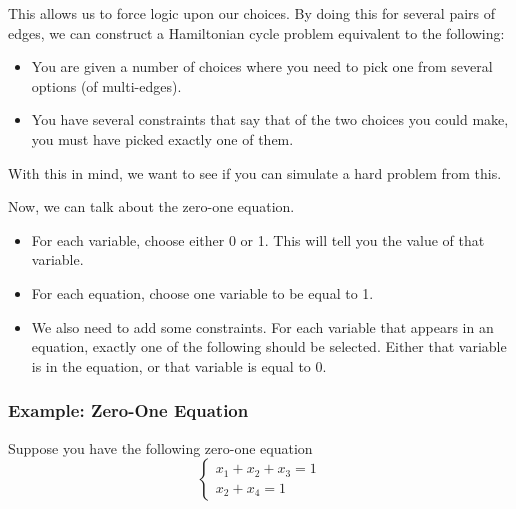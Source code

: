 \documentclass[letterpaper]{article}
\begin{document}
\begin{itemize}
\begin{center}
    \end{center}
    This allows us to force logic upon our choices. By doing this for several pairs of edges, we can construct a Hamiltonian cycle problem equivalent to the following:  
    \begin{itemize}
        \item You are given a number of choices where you need to pick one from several options (of multi-edges). 
        \item You have several constraints that say that of the two choices you could make, you must have picked exactly one of them. 
    \end{itemize}
    With this in mind, we want to see if you can simulate a hard problem from this. 
\end{itemize}
Now, we can talk about the zero-one equation. 
\begin{itemize}
    \item For each variable, choose either 0 or 1. This will tell you the value of that variable.
    \item For each equation, choose one variable to be equal to 1.
    \item We also need to add some constraints. For each variable that appears in an equation, exactly one of the following should be selected. Either that variable is in the equation, or that variable is equal to 0. 
\end{itemize}

\subsubsection{Example: Zero-One Equation}
Suppose you have the following zero-one equation 
\[\begin{cases}
    x_1 + x_2 + x_3 = 1 \\ 
    x_2 + x_4 = 1
\end{cases}\]
\end{document}

